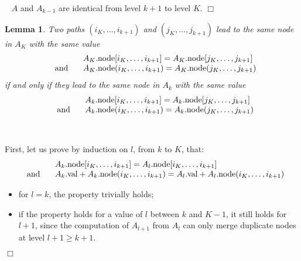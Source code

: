 \documentclass[nocover]             %
{NASA}                       %
\newcommand{\m}{\mbox}
\newtheorem{mylemma}{Lemma}[section]
\newcommand{\Proof}[1]{\par\noindent{\bf Proof.}~{#1}$\Box$}
\newcommand{\val}[1]{#1{\rm .val}}
\newcommand{\node}[1]{#1{\rm .node}}
\begin{document}
\Proof{
  $A$ and $A_{k-1}$ are identical from level $k+1$ to level $K$.
}%

\begin{mylemma}
  \label{lemma-n-k}
  Two paths $(i_K, \ldots, i_{k+1})$ and $(j_K, \ldots, j_{k+1})$ lead to the same node in $A_K$ with the same value
$$
\begin{array}{ll}
&\node{A_K}[i_K, \ldots, i_{k+1}] = \node{A_K}[j_K, \ldots, j_{k+1}]\\
\;\;\;\m{and}\;\;\;&
\node{A_K}(i_K, \ldots, i_{k+1}) = \node{A_K}(j_K, \ldots, j_{k+1})
\end{array}
$$
if and only if they lead to the same node in $A_k$ with the same value
$$
\begin{array}{ll}
&\node{A_k}[i_K, \ldots, i_{k+1}] = \node{A_k}[j_K, \ldots, j_{k+1}]\\
\;\;\;\m{and}\;\;\;&
\node{A_k}(i_K, \ldots, i_{k+1}) = \node{A_k}(j_K, \ldots, j_{k+1})
\end{array}
$$
\end{mylemma}

\Proof{
  First, let us prove by induction on $l$, from $k$ to $K$, that:
$$
\begin{array}{ll}
&\node{A_k}[i_K, \ldots, i_{k+1}] = \node{A_l}[i_K, \ldots, i_{k+1}]\\
\;\;\;\m{and}\;\;\;&
\val{A_k}+\node{A_k}(i_K, \ldots, i_{k+1}) = \val{A_l}+\node{A_l}(i_K, \ldots, i_{k+1})
\end{array}
$$
  \begin{itemize}
  \item for $l = k$, the property trivially holds;
  \item if the property holds for a value of $l$ between $k$ and $K-1$, it still holds for $l+1$, since the computation of $A_{l+1}$ from $A_l$ can only merge duplicate nodes at level $l+1 \ge k+1$.
  \end{itemize}
}%
\end{document}
